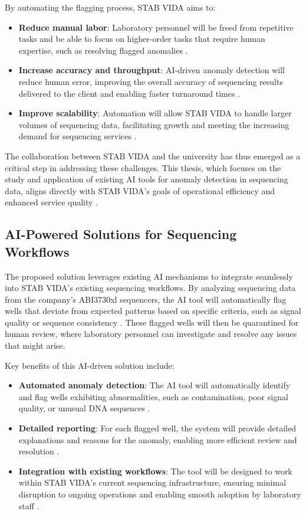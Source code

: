 By automating the flagging process, STAB VIDA aims to:

\begin{itemize} 
  \item \textbf{Reduce manual labor}: Laboratory personnel will be freed from repetitive tasks and be able to focus on higher-order tasks that require human expertise, such as resolving flagged anomalies \cite{Yang2020}. 
  \item \textbf{Increase accuracy and throughput}: AI-driven anomaly detection will reduce human error, improving the overall accuracy of sequencing results delivered to the client and enabling faster turnaround times \cite{Chen2019}. 
  \item \textbf{Improve scalability}: Automation will allow STAB VIDA to handle larger volumes of sequencing data, facilitating growth and meeting the increasing demand for sequencing services \cite{Rajendran2021}.
\end{itemize}

The collaboration between STAB VIDA and the university has thus emerged as a critical step in addressing these challenges. This thesis, which focuses on the study and application of existing AI tools for anomaly detection in sequencing data, aligns directly with STAB VIDA’s goals of operational efficiency and enhanced service quality \cite{Sheng2018}.

\subsection{AI-Powered Solutions for Sequencing Workflows}

The proposed solution leverages existing AI mechanisms to integrate seamlessly into STAB VIDA’s existing sequencing workflows. By analyzing sequencing data from the company's ABI3730xl sequencers, the AI tool will automatically flag wells that deviate from expected patterns based on specific criteria, such as signal quality or sequence consistency \cite{Gokcay2019}. These flagged wells will then be quarantined for human review, where laboratory personnel can investigate and resolve any issues that might arise.

Key benefits of this AI-driven solution include:

\begin{itemize} \item \textbf{Automated anomaly detection}: The AI tool will automatically identify and flag wells exhibiting abnormalities, such as contamination, poor signal quality, or unusual DNA sequences \cite{Wu2020}. \item \textbf{Detailed reporting}: For each flagged well, the system will provide detailed explanations and reasons for the anomaly, enabling more efficient review and resolution \cite{Zhang2021}. \item \textbf{Integration with existing workflows}: The tool will be designed to work within STAB VIDA’s current sequencing infrastructure, ensuring minimal disruption to ongoing operations and enabling smooth adoption by laboratory staff \cite{Chen2021}. \end{itemize}

